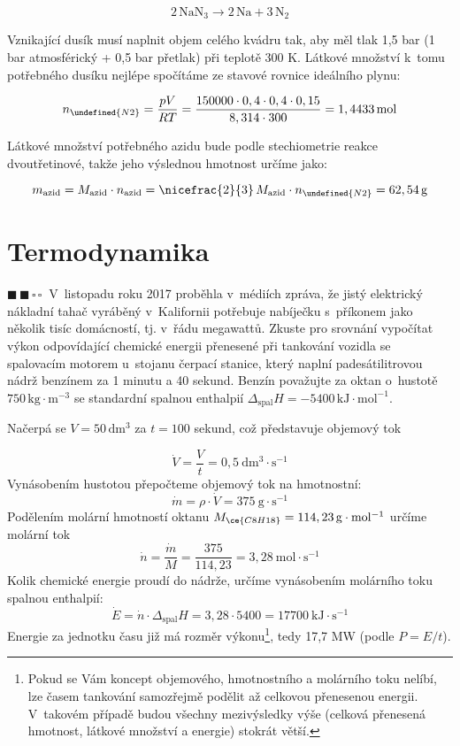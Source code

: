 \documentclass{book}
\let\ch\undefined
\newcommand{\dva}{$\blacksquare \, \blacksquare \, \square \, \square \; \; $}
\renewenvironment{quotation}{\par}{\par} %
\begin{document}
\[
\mathrm{2\,NaN_{3}\rightarrow2\,Na+3\,N_{2}}
\]

Vznikající dusík musí naplnit objem celého kvádru tak, aby měl tlak
1,5 bar (1 bar atmosférický + 0,5 bar přetlak) při teplotě 300 K.
Látkové množství k~tomu potřebného dusíku nejlépe spočítáme ze stavové
rovnice ideálního plynu:

\[
n_{\ch{N2}}=\frac{pV}{RT}=\frac{150000\cdot0,4\cdot0,4\cdot0,15}{8,314\cdot300}=1,4433\,\mathrm{mol}
\]

Látkové množství potřebného azidu bude podle stechiometrie reakce
dvoutřetinové, takže jeho výslednou hmotnost určíme jako:

\[
m_{\mathrm{azid}}=M_{\mathrm{azid}}\cdot n_{\mathrm{azid}}=\nicefrac{2}{3}\,M_{\mathrm{azid}}\cdot n_{\ch{N2}}=62,54\,\mathrm{g}
\]

\section{Termodynamika}

\begin{quotation}
\dva V~listopadu roku 2017 proběhla v~médiích zpráva, že jistý elektrický
nákladní tahač vyráběný v~Kalifornii potřebuje nabíječku s~příkonem
jako několik tisíc domácností, tj. v~řádu megawattů. Zkuste pro srovnání
vypočítat výkon odpovídající chemické energii přenesené při tankování
vozidla se spalovacím motorem u~stojanu čerpací stanice, který naplní
padesátilitrovou nádrž benzínem za 1 minutu a 40 sekund. Benzín považujte
za oktan o~hustotě $750\,\mathrm{kg\cdot m^{-3}}$ se standardní spalnou
enthalpií $\Delta_{\mathrm{spal}}H = -5400\,\mathrm{kJ\cdot mol^{-1}}$. 
\end{quotation} \dotfill \par 
Načerpá se $V=50\,\mathrm{dm^{3}}$ za $t=100$ sekund, což představuje
objemový tok

\[
\dot{V}=\frac{V}{t}=0,5\ \mathrm{dm^{3}\cdot s^{-1}}
\]
Vynásobením hustotou přepočteme objemový tok na hmotnostní: 
\[
\dot{m}=\rho\cdot\dot{V}=375\ \mathrm{g\cdot s^{-1}}
\]
Podělením molární hmotností oktanu $M_{\ce{C8H18}}=114,23\,\mathrm{g\cdot mol^{-1}}$
určíme molární tok 
\[
\dot{n}=\frac{\dot{m}}{M}=\frac{375}{114,23}=3,28\ \mathrm{mol\cdot s^{-1}}
\]
Kolik chemické energie proudí do nádrže, určíme vynásobením molárního
toku spalnou enthalpií: 
\[
\dot{E}=\dot{n}\cdot\Delta_{\mathrm{spal}}H=3,28\cdot5400=17700\ \mathrm{kJ\cdot s^{-1}}
\]
Energie za jednotku času již má rozměr výkonu\footnote{Pokud se Vám koncept objemového, hmotnostního a molárního toku nelíbí, lze časem tankování samozřejmě podělit až celkovou přenesenou energii. V~takovém případě budou všechny mezivýsledky výše (celková přenesená hmotnost, látkové množství a energie) stokrát větší.}, tedy 17,7 MW (podle $P=E/t$).
\end{document}
